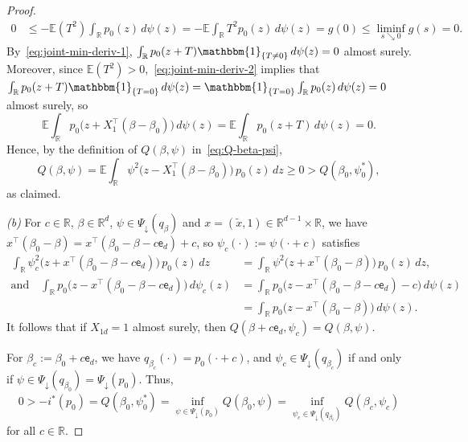 \documentclass[a4paper]{article}
\newcommand{\R}{\mathbb{R}}
\newcommand{\E}{\mathbb{E}}
\newcommand{\Ind}{\mathbbm{1}}
\theoremstyle{definition}
\begin{document}
\begin{proof}
\begin{align}
0 &\leq -\E(T^2) \int_\R p_0(z)\,d\psi(z) = -\E \int_\R T^2 p_0(z)\,d\psi(z) = g(0) \leq \liminf_{s \searrow 0} g(s) = 0.
\end{align}
By~\eqref{eq:joint-min-deriv-1}, $\int_\R p_0(z + T)\Ind_{\{T \neq 0\}}\,d\psi(z) = 0$ almost surely. Moreover, since $\E(T^2) > 0$,~\eqref{eq:joint-min-deriv-2} implies that $\int_\R p_0(z + T)\Ind_{\{T = 0\}}\,d\psi(z) = \Ind_{\{T = 0\}}\int_\R p_0(z)\,d\psi(z) = 0$ almost surely, so
\begin{equation}
\label{eq:joint-min-deriv}
\E\int_\R p_0\bigl(z + X_1^\top(\beta - \beta_0)\bigr)\,d\psi(z) = \E\int_\R p_0(z + T)\,d\psi(z) = 0.
\end{equation}
Hence, by the definition of $Q(\beta,\psi)$ in~\eqref{eq:Q-beta-psi},
\[
Q(\beta,\psi) = \E\int_\R \psi^2\bigl(z - X_1^\top(\beta - \beta_0)\bigr)\,p_0(z)\,dz \geq 0 > Q(\beta_0,\psi_0^*),
\]
as claimed.

\medskip
\noindent
\emph{(b)} For $c \in \R$, $\beta \in \R^d$, $\psi \in \Psi_\downarrow(q_\beta)$ and $x = (\tilde{x},1) \in \R^{d-1} \times \R$, we have $x^\top (\beta_0 - \beta) = x^\top (\beta_0 - \beta - c\mathsf{e}_d) + c$, so $\psi_c(\cdot) := \psi(\cdot + c)$ satisfies
\begin{align*}
\int_\R \psi_c^2\bigl(z + x^\top(\beta_0 - \beta - c\mathsf{e}_d)\bigr)\,p_0(z)\,dz &= \int_\R \psi^2\bigl(z + x^\top(\beta_0 - \beta)\bigr)\,p_0(z)\,dz, \\
\text{and}\quad \int_\R p_0\bigl(z - x^\top(\beta_0 - \beta - c\mathsf{e}_d)\bigr)\,d\psi_c(z) &= \int_\R p_0\bigl(z - x^\top(\beta_0 - \beta - c\mathsf{e}_d) - c\bigr)\,d\psi(z) \\
&= \int_\R p_0\bigl(z - x^\top(\beta_0 - \beta)\bigr)\,d\psi(z).
\end{align*}
It follows that if $X_{1d} = 1$ almost surely, then $Q(\beta + c\mathsf{e}_d,\psi_c) = Q(\beta,\psi)$. 

For $\beta_c := \beta_0 + c\mathsf{e}_d$, we have $q_{\beta_c}(\cdot) = p_0(\cdot + c)$, and $\psi_c \in \Psi_\downarrow(q_{\beta_c})$ if and only if $\psi \in \Psi_\downarrow(q_{\beta_0}) = \Psi_\downarrow(p_0)$.  Thus,
\begin{equation}
\label{eq:beta-c}
0 > -i^*(p_0) = Q(\beta_0,\psi_0^*) = \inf_{\psi \in \Psi_\downarrow(p_0)} Q(\beta_0,\psi) = \inf_{\psi_c \in \Psi_\downarrow(q_{\beta_c})} Q(\beta_c,\psi_c)
\end{equation}
for all $c \in \R$.


\end{proof}
\end{document}
